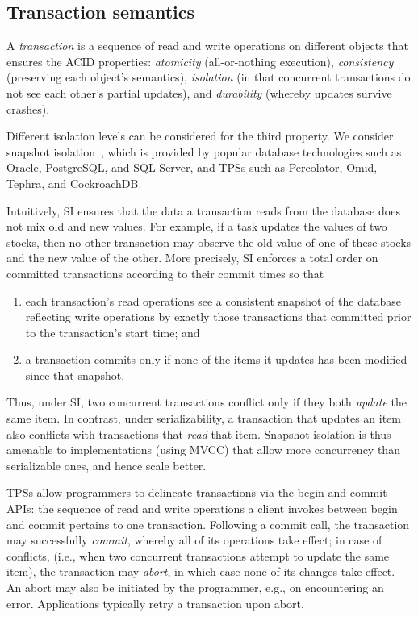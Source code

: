 \subsection{Transaction semantics} \label{ssec:transactions}

A \emph{transaction} is a sequence of read and write operations on different objects that ensures the ACID properties:
\emph{atomicity} (all-or-nothing execution), \emph{consistency} (preserving each object's semantics), 
\emph{isolation} (in that concurrent transactions do not see each other's partial updates), and 
\emph{durability} (whereby updates survive crashes).

Different isolation levels can be considered for the third property. We consider 
snapshot isolation~\cite{DBLP:conf/sigmod/BerensonBGMOO95}, 
which is provided by popular database technologies such as Oracle, PostgreSQL, and SQL Server,
and TPSs such as Percolator, Omid, Tephra, and  CockroachDB.

Intuitively, SI ensures that the data a transaction reads from the database 
does not mix old and new values. For example, if a task updates the values of two stocks, then no other transaction may observe the old value of one of these stocks and the new value of the other. 
%
More precisely, SI enforces a total order on committed transactions according to their commit times so that 
\begin{enumerate}
    \setlength{\itemsep}{0pt}
    \setlength{\parskip}{0pt}
    \setlength{\parsep}{2pt}  
\item
each transaction's read operations see a consistent snapshot of the database reflecting write operations by
 exactly those transactions that committed prior to the transaction's start time; and 
\item
 a transaction commits only if none of the items it updates has been modified since that snapshot.
 \end{enumerate}
Thus, under SI, two concurrent transactions conflict only if they both \emph{update} the same item.  
In contrast, under serializability, a transaction that updates an item also conflicts with transactions that \emph{read} that item. Snapshot isolation is thus amenable to implementations (using MVCC) that 
allow more concurrency than serializable ones, and hence scale better.

TPSs allow programmers to  delineate transactions via the begin and commit APIs: 
the sequence of read and write operations a client invokes between begin and  commit pertains to one transaction.
Following a commit call, the transaction may successfully \emph{commit}, whereby all of its operations take effect;
in case of conflicts, (i.e., when two concurrent transactions attempt to update the same item), the transaction may
\emph{abort}, in which case none of its changes take effect. An abort may also be initiated by the programmer, e.g., 
on encountering an error. Applications typically retry a transaction upon  abort. 


